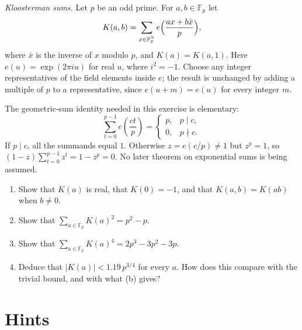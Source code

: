 \begin{exercise}[$\star\star\star$]\label{pb:kloosterman}
\emph{Kloosterman sums.} Let $p$ be an odd prime. For $a,b\in\mathbb F_p$ let
\[
K(a,b)=\sum_{x\in\mathbb F_p^\times}e\Bigl(\frac{ax+b\bar x}p\Bigr),
\]
where $\bar x$ is the inverse of $x$ modulo $p$, and $K(a)=K(a,1)$. Here $e(u)=\exp(2\pi i u)$ for real $u$, where $i^2=-1$. Choose any integer representatives of the field elements inside $e$; the result is unchanged by adding a multiple of $p$ to a representative, since $e(u+m)=e(u)$ for every integer $m$.

The geometric-sum identity needed in this exercise is elementary:
\[
\sum_{t=0}^{p-1}e\left(\frac{ct}{p}\right)
=\begin{cases}p,&p\mid c,\\0,&p\nmid c.\end{cases}
\]
If $p\mid c$, all the summands equal $1$. Otherwise $z=e(c/p)\ne1$ but $z^p=1$, so $(1-z)\sum_{t=0}^{p-1}z^t=1-z^p=0$. No later theorem on exponential sums is being assumed.
\begin{enumerate}[label=(\alph*)]
\item Show that $K(a)$ is real, that $K(0)=-1$, and that $K(a,b)=K(ab)$ when $b\ne0$.
\item Show that $\sum_{a\in\mathbb F_p}K(a)^2=p^2-p$.
\item Show that $\sum_{a\in\mathbb F_p}K(a)^4=2p^3-3p^2-3p$.
\item Deduce that $|K(a)|<1.19\,p^{3/4}$ for every $a$. How does this compare with the trivial bound, and with what (b) gives?
\end{enumerate}
\end{exercise}

\section{Hints}

